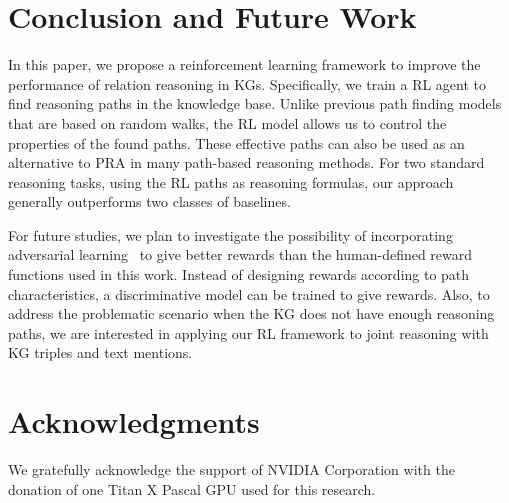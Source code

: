 \documentclass[11pt,letterpaper]{article}
\begin{document}
\section{Conclusion and Future Work}
\label{sec:conclude}
In this paper, we propose a reinforcement learning framework to improve the performance of relation reasoning in KGs. Specifically, we train a RL agent to find reasoning paths in the knowledge base. Unlike previous path finding models that are based on random walks, the RL model allows us to control the properties of the found paths. These effective paths can also be used as an alternative to PRA in many path-based reasoning methods. For two standard reasoning tasks, using the RL paths as reasoning formulas, our approach generally outperforms two classes of baselines. 

For future studies, we plan to investigate the possibility of incorporating adversarial learning~\cite{goodfellow2014generative} to give better rewards than the human-defined reward functions used in this work. Instead of designing rewards according to path characteristics, a discriminative model can be trained to give rewards. Also, to address the problematic scenario when the KG does not have enough reasoning paths, we are interested in applying our RL framework to joint reasoning with KG triples and text mentions.

\section*{Acknowledgments}
We gratefully acknowledge the support of NVIDIA Corporation with the donation of one Titan X Pascal GPU used for this research.




\end{document}
